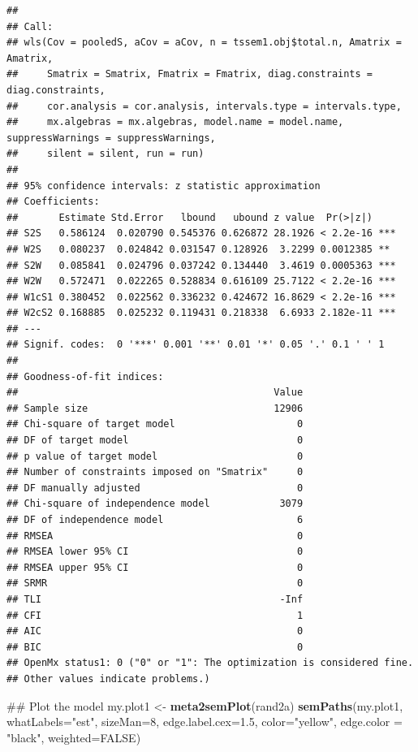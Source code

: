 \documentclass[]{article}
\newenvironment{Shaded}{\begin{snugshade}}{\end{snugshade}}
\newcommand{\KeywordTok}[1]{\textcolor[rgb]{0.13,0.29,0.53}{\textbf{#1}}}
\newcommand{\DataTypeTok}[1]{\textcolor[rgb]{0.13,0.29,0.53}{#1}}
\newcommand{\DecValTok}[1]{\textcolor[rgb]{0.00,0.00,0.81}{#1}}
\newcommand{\FloatTok}[1]{\textcolor[rgb]{0.00,0.00,0.81}{#1}}
\newcommand{\StringTok}[1]{\textcolor[rgb]{0.31,0.60,0.02}{#1}}
\newcommand{\OtherTok}[1]{\textcolor[rgb]{0.56,0.35,0.01}{#1}}
\newcommand{\NormalTok}[1]{#1}
\begin{document}
\begin{verbatim}
## 
## Call:
## wls(Cov = pooledS, aCov = aCov, n = tssem1.obj$total.n, Amatrix = Amatrix, 
##     Smatrix = Smatrix, Fmatrix = Fmatrix, diag.constraints = diag.constraints, 
##     cor.analysis = cor.analysis, intervals.type = intervals.type, 
##     mx.algebras = mx.algebras, model.name = model.name, suppressWarnings = suppressWarnings, 
##     silent = silent, run = run)
## 
## 95% confidence intervals: z statistic approximation
## Coefficients:
##       Estimate Std.Error   lbound   ubound z value  Pr(>|z|)    
## S2S   0.586124  0.020790 0.545376 0.626872 28.1926 < 2.2e-16 ***
## W2S   0.080237  0.024842 0.031547 0.128926  3.2299 0.0012385 ** 
## S2W   0.085841  0.024796 0.037242 0.134440  3.4619 0.0005363 ***
## W2W   0.572471  0.022265 0.528834 0.616109 25.7122 < 2.2e-16 ***
## W1cS1 0.380452  0.022562 0.336232 0.424672 16.8629 < 2.2e-16 ***
## W2cS2 0.168885  0.025232 0.119431 0.218338  6.6933 2.182e-11 ***
## ---
## Signif. codes:  0 '***' 0.001 '**' 0.01 '*' 0.05 '.' 0.1 ' ' 1
## 
## Goodness-of-fit indices:
##                                            Value
## Sample size                                12906
## Chi-square of target model                     0
## DF of target model                             0
## p value of target model                        0
## Number of constraints imposed on "Smatrix"     0
## DF manually adjusted                           0
## Chi-square of independence model            3079
## DF of independence model                       6
## RMSEA                                          0
## RMSEA lower 95% CI                             0
## RMSEA upper 95% CI                             0
## SRMR                                           0
## TLI                                         -Inf
## CFI                                            1
## AIC                                            0
## BIC                                            0
## OpenMx status1: 0 ("0" or "1": The optimization is considered fine.
## Other values indicate problems.)
\end{verbatim}

\begin{Shaded}
\begin{Highlighting}[]
\NormalTok{## Plot the model}
\NormalTok{my.plot1 <-}\StringTok{ }\KeywordTok{meta2semPlot}\NormalTok{(rand2a)}
\KeywordTok{semPaths}\NormalTok{(my.plot1, }\DataTypeTok{whatLabels=}\StringTok{"est"}\NormalTok{, }\DataTypeTok{sizeMan=}\DecValTok{8}\NormalTok{, }\DataTypeTok{edge.label.cex=}\FloatTok{1.5}\NormalTok{, }
         \DataTypeTok{color=}\StringTok{"yellow"}\NormalTok{, }\DataTypeTok{edge.color =} \StringTok{"black"}\NormalTok{, }\DataTypeTok{weighted=}\OtherTok{FALSE}\NormalTok{)}
\end{Highlighting}
\end{Shaded}
\end{document}
